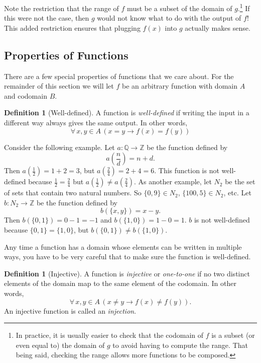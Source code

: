 \documentclass[11pt,oneside]{book}
\theoremstyle{definition}
\newtheorem{defn}[thm]{Definition}
\begin{document}
Note the restriction that the range of $f$ must be a subset of the domain of $g$.\footnote{
    In practice, it is usually easier to check that the codomain of $f$ is a subset (or even equal to) the domain of $g$ to avoid having to compute the range.
    That being said, checking the range allows more functions to be composed.
}
If this were not the case, then $g$ would not know what to do with the output of $f$!
This added restriction ensures that plugging $f(x)$ into $g$ actually makes sense.


\subsection{Properties of Functions}
There are a few special properties of functions that we care about.
For the remainder of this section we will let $f$ be an arbitrary function with domain $A$ and codomain $B$.
\begin{defn}[Well-defined]
    A function is \emph{well-defined} if writing the input in a different way always gives the same output.
    In other words,
    \[ \forall\, x, y \in A\, (x = y \rightarrow f(x) = f(y)) \]
\end{defn}

Consider the following example.
Let $a: \mathbb{Q} \to \mathbb{Z}$ be the function defined by
\[ a\left( \frac{n}{d} \right) = n + d. \]
Then $a\left( \frac{1}{2} \right) = 1 + 2 = 3$, but $a\left( \frac{2}{4} \right) = 2 + 4 = 6$.
This function is not well-defined because $\frac{1}{2} = \frac{2}{4}$ but $a\left( \frac{1}{2} \right) \neq a\left( \frac{2}{4} \right)$.
As another example, let $N_{2}$ be the set of sets that contain two natural numbers.
So $\{ 0, 9 \} \in N_{2}$, $\{ 100, 5 \} \in N_{2}$, etc.
Let $b: N_{2} \to \mathbb{Z}$ be the function defined by
\[ b(\{ x, y \}) = x - y. \]
Then $b(\{ 0, 1 \}) = 0 - 1 = -1$ and $b(\{ 1, 0 \}) = 1 - 0 = 1$.
$b$ is not well-defined because $\{ 0, 1 \} = \{ 1, 0 \}$, but $b(\{ 0, 1 \}) \neq b(\{ 1, 0 \})$.

Any time a function has a domain whose elements can be written in multiple ways, you have to be very careful that to make sure the function is well-defined.

\begin{defn}[Injective]
    A function is \emph{injective} or \emph{one-to-one} if no two distinct elements of the domain map to the same element of the codomain.
    In other words,
    \[ \forall\, x, y \in A\, (x \neq y \rightarrow f(x) \neq f(y)). \]
    An injective function is called an \emph{injection}.
\end{defn}
\end{document}

